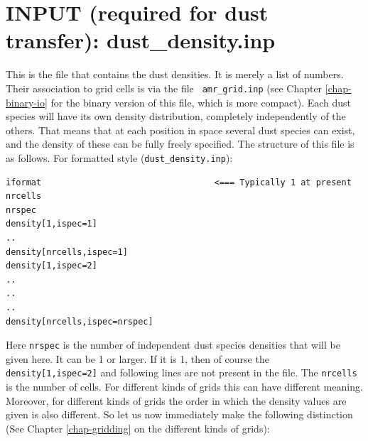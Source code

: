 \documentclass{report}
\newenvironment{asciibox}%
  {\begin{list}{}{%
    \setlength{\topsep}{0.5em}%
    \setlength{\parskip}{0em}%
    \setlength{\parsep}{0em}%
    \setlength{\itemsep}{0em}%
    \setlength{\rightmargin}{0em}%
    \setlength{\leftmargin}{3.0em}%
    \setlength{\labelsep}{1em}%
    \setlength{\labelwidth}{2em}%
  }\normalfont\footnotesize\item}
  {\end{list}}
\begin{document}
\section{INPUT (required for dust transfer): dust\_density.inp}
\label{sec-dustdens}
%
This is the file that contains the dust densities. It is merely a list of
numbers. Their association to grid cells is via the file {\small\tt
  amr\_grid.inp} (see Chapter \ref{chap-binary-io} for the binary version of
this file, which is more compact).  Each dust species will have its own
density distribution, completely independently of the others. That means
that at each position in space several dust species can exist, and the
density of these can be fully freely specified. The structure of this file
is as follows. For formatted style ({\small\tt dust\_density.inp}):
\begin{asciibox}\begin{verbatim}
iformat                                  <=== Typically 1 at present
nrcells
nrspec
density[1,ispec=1]
..
density[nrcells,ispec=1]
density[1,ispec=2]
..
..
..
density[nrcells,ispec=nrspec]
\end{verbatim}\end{asciibox}
Here {\small\tt nrspec} is the number of independent dust species densities
that will be given here. It can be 1 or larger. If it is 1, then of course
the {\small\tt density[1,ispec=2]} and following lines are not present
in the file. The {\small\tt nrcells} is the number of cells. For different
kinds of grids this can have different meaning. Moreover, for different
kinds of grids the order in which the density values are given is also
different.  So let us now immediately make the following distinction (See
Chapter \ref{chap-gridding} on the different kinds of grids):
\end{document}
